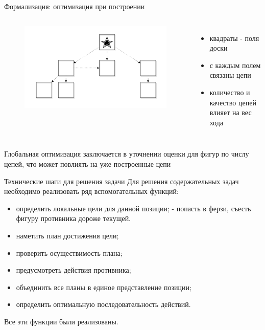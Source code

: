 \begin{frame}{Формализация: оптимизация при построении}
\begin{columns}
\begin{figure}
\includegraphics[scale=0.2]{./pictures/piece.png}
\end{figure}
\begin{itemize}
\item квадраты - поля доски
\item с каждым полем связаны цепи
\item количество и качество цепей влияет на вес хода
\end{itemize}
\end{columns}
Глобальная оптимизация заключается в уточнении оценки для фигур по числу цепей, что может повлиять на уже построенные цепи
\end{frame}

\begin{frame}{Технические шаги для решения задачи}
Для решения содержательных задач необходимо реализовать ряд вспомогательных функций:
\begin{itemize}
\item определить локальные цели для данной позиции; - попасть в ферзи, съесть фигуру противника дороже текущей.
\item наметить план достижения цели;
\item проверить осуществимость плана;
\item предусмотреть действия противника;
\item объединить все планы в единое представление позиции;
\item определить оптимальную последовательность действий.
\end{itemize}
Все эти функции были реализованы.
\end{frame}